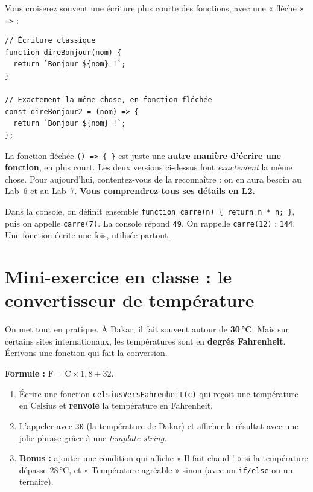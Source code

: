 \documentclass[11pt,a4paper]{article}
\newcommand{\code}[1]{\texttt{#1}}
\begin{document}
Vous croiserez souvent une écriture plus courte des fonctions, avec une « flèche » \code{=>} :

\begin{lstlisting}[style=js]
// Écriture classique
function direBonjour(nom) {
  return `Bonjour ${nom} !`;
}

// Exactement la même chose, en fonction fléchée
const direBonjour2 = (nom) => {
  return `Bonjour ${nom} !`;
};
\end{lstlisting}

\begin{attentionbox}
La fonction fléchée \code{() => \{ \}} est juste une \textbf{autre manière d'écrire une fonction}, en plus court. Les deux versions ci-dessus font \emph{exactement} la même chose. Pour aujourd'hui, contentez-vous de la reconnaître : on en aura besoin au Lab~6 et au Lab~7. \textbf{Vous comprendrez tous ses détails en L2.}
\end{attentionbox}

\begin{infobox}
Dans la console, on définit ensemble \code{function carre(n) \{ return n * n; \}}, puis on appelle \code{carre(7)}. La console répond \code{49}. On rappelle \code{carre(12)} : \code{144}. Une fonction écrite une fois, utilisée partout.
\end{infobox}

\section{Mini-exercice en classe : le convertisseur de température}

On met tout en pratique. À Dakar, il fait souvent autour de \textbf{30\,°C}. Mais sur certains sites internationaux, les températures sont en \textbf{degrés Fahrenheit}. Écrivons une fonction qui fait la conversion.

\textbf{Formule :} $\text{F} = \text{C} \times 1{,}8 + 32$.

\begin{objectifbox}
\begin{enumerate}[leftmargin=*]
  \item Écrire une fonction \code{celsiusVersFahrenheit(c)} qui reçoit une température en Celsius et \textbf{renvoie} la température en Fahrenheit.
  \item L'appeler avec \code{30} (la température de Dakar) et afficher le résultat avec une jolie phrase grâce à une \emph{template string}.
  \item \textbf{Bonus :} ajouter une condition qui affiche « Il fait chaud ! » si la température dépasse 28\,°C, et « Température agréable » sinon (avec un \code{if/else} ou un ternaire).
\end{enumerate}
\end{objectifbox}
\end{document}
